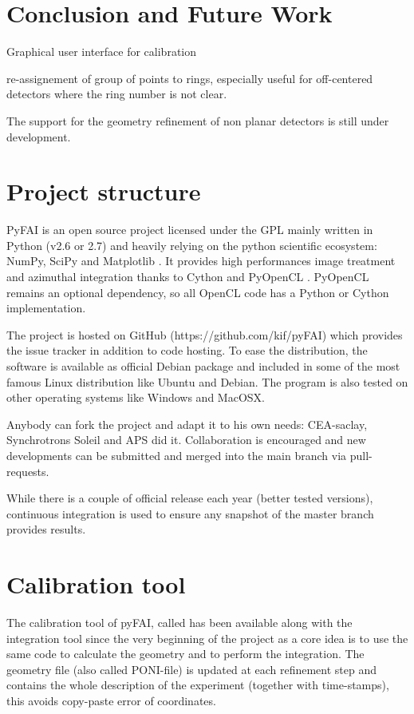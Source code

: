 \documentclass[preprint]{iucr}
\begin{document}
\section{Conclusion and Future Work}


Graphical user interface for calibration

re-assignement of group of points to rings, especially useful for off-centered
detectors where the ring number is not clear.

The support for the geometry refinement of non planar detectors is still under
development.




\appendix
\section{Project structure}
PyFAI is an open source project licensed under the GPL mainly written in Python (v2.6 or 2.7)
and heavily relying on the python scientific ecosystem: NumPy\cite{numpy},
SciPy \cite{scipy} and Matplotlib \cite{matplotlib}.
It provides high performances image treatment and azimuthal integration thanks
to Cython \cite{cython} and PyOpenCL \cite{pyopencl}. 
PyOpenCL remains an optional dependency, so all OpenCL code has a
Python or Cython implementation.

The project is hosted on GitHub (https://github.com/kif/pyFAI) which provides
the issue tracker in addition to code hosting.
To ease the distribution, the
software is available as official Debian package and included in some of the
most famous Linux distribution like Ubuntu and Debian.
The program is also tested on other operating systems like Windows and
MacOSX.

Anybody can fork the project and adapt it to his own needs: CEA-saclay,
Synchrotrons Soleil and APS did it. Collaboration is encouraged and 
new developments can be submitted and merged into the main branch
via pull-requests. 

While there is a couple of official release each year (better
tested versions), continuous integration is used to ensure any snapshot of the
master branch provides  results.

\section{Calibration tool}
\label{annex_calib}

The calibration tool of pyFAI, called  has been available
along with the integration tool since the very beginning of the project as a core idea
is to use the same code to calculate the geometry and to perform the integration.
The geometry file (also called PONI-file) is updated at each refinement step and
contains the whole description of the experiment (together with time-stamps),
this avoids copy-paste error of coordinates.
\end{document}

